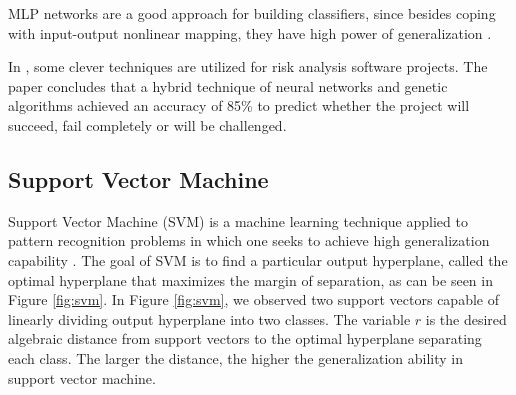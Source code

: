 MLP networks are a good approach for building classifiers, since besides coping with input-output nonlinear mapping, they have high power of generalization \cite{haykin-1994}.

In \cite{HUHUANG2007}, some clever techniques are utilized for risk analysis software projects. The paper concludes that a hybrid technique of neural networks and genetic algorithms achieved an accuracy of 85\% to predict whether the project will succeed, fail completely or will be challenged.

\subsection{Support Vector Machine}

Support Vector Machine (SVM) is a machine learning technique applied to pattern recognition problems in which one seeks to achieve high generalization capability \cite{HAYKIN2007} \cite{valenca1995fundamentos}. The goal of SVM is to find a particular output hyperplane, called the optimal hyperplane that maximizes the margin of separation, as can be seen in Figure \ref{fig:svm}. In Figure \ref{fig:svm}, we observed two support vectors capable of linearly dividing output hyperplane into two classes. The variable $r$ is the desired algebraic distance from support vectors to the optimal hyperplane separating each class. The larger the distance, the higher the generalization ability in support vector machine.

